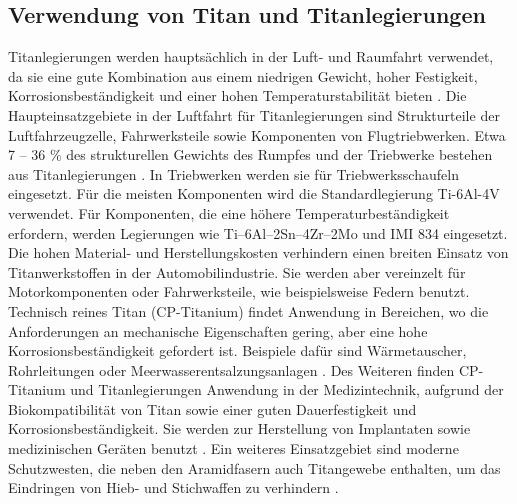 \subsection{Verwendung von Titan und Titanlegierungen}
Titanlegierungen werden hauptsächlich in der Luft- und Raumfahrt verwendet, da sie eine gute Kombination aus einem niedrigen Gewicht, hoher Festigkeit, Korrosionsbeständigkeit und einer hohen Temperaturstabilität bieten \cite{C.Leyens.2005,R.R.Boyer.1996,M.PetersJ.KumpfertC.WardC.Leyens.2003}. Die Haupteinsatzgebiete in der Luftfahrt für Titanlegierungen sind Strukturteile der Luftfahrzeugzelle, Fahrwerksteile sowie Komponenten von Flugtriebwerken. Etwa 7 -- 36 \% des strukturellen Gewichts des Rumpfes und der Triebwerke bestehen aus Titanlegierungen \cite{Lutjering.2007}. In Triebwerken werden sie für Triebwerksschaufeln eingesetzt. Für die meisten Komponenten wird die Standardlegierung Ti-6Al-4V verwendet. Für Komponenten, die eine höhere Temperaturbeständigkeit erfordern, werden Legierungen wie Ti–6Al–2Sn–4Zr–2Mo und IMI 834 eingesetzt. Die hohen Material- und Herstellungskosten verhindern einen breiten Einsatz von Titanwerkstoffen in der Automobilindustrie. Sie werden aber vereinzelt für Motorkomponenten oder Fahrwerksteile, wie beispielsweise Federn benutzt. Technisch reines Titan (CP-Titanium) findet Anwendung in Bereichen, wo die Anforderungen an mechanische Eigenschaften gering, aber eine hohe Korrosionsbeständigkeit gefordert ist. Beispiele dafür sind Wärmetauscher, Rohrleitungen oder Meerwasserentsalzungsanlagen \cite{A.D.Khawajia.2008}. Des Weiteren finden CP-Titanium und Titanlegierungen Anwendung in der Medizintechnik, aufgrund der Biokompatibilität von Titan sowie einer guten Dauerfestigkeit und Korrosionsbeständigkeit. Sie werden zur Herstellung von Implantaten sowie medizinischen Geräten benutzt \cite{M.GeethaA.K.SinghR.AsokamaniA.K.Gogia.2009}. Ein weiteres Einsatzgebiet sind moderne Schutzwesten, die neben den Aramidfasern auch Titangewebe enthalten, um das Eindringen von Hieb- und Stichwaffen zu verhindern \cite{C.Leyens.2005}.  
